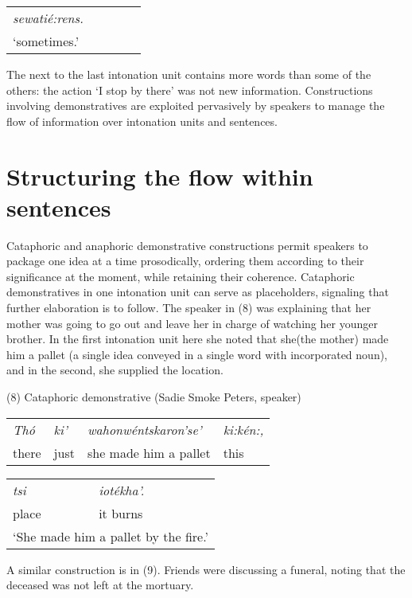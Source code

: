\documentclass[output=paper,colorlinks,citecolor=brown
]{langscibook}
\begin{document}
\begin{tabular}{lllll}
\emph{sewatié:rens.}\\
`sometimes.'
\end{tabular}\bigskip

The next to the last intonation unit contains more words than some of the others: the action `I stop by there' was not new information. 
Constructions involving demonstratives are exploited pervasively by speakers to manage the flow of information over intonation units and sentences.

\section{Structuring the flow within sentences}

Cataphoric and anaphoric demonstrative constructions permit speakers to package one idea at a time prosodically, ordering them according to their significance at the moment, while retaining their coherence. Cataphoric demonstratives in one intonation unit can serve as placeholders, signaling that further elaboration is to follow. The speaker in (8) was explaining that her mother was going to go out and leave her in charge of watching her younger brother. In the first intonation unit here she noted that she(the mother) made him a pallet (a single idea conveyed in a single word with incorporated noun), and in the second, she supplied the location.
\bigskip

(8) Cataphoric demonstrative (Sadie Smoke Peters, speaker)\\

\begin{tabular}{llll}
\emph{Thó} & \emph{ki'} & \emph{wahonwéntskaron'se'} & \emph{ki:kén:,}\\

there & just & she made him a pallet & this\\
\end{tabular}\bigskip

\begin{tabular}{ll}
\emph{tsi} & \emph{iotékha'.}\\

place & it burns\\
\multicolumn{2}{l}{`She made him a pallet by the fire.'}
\end{tabular}\bigskip

A similar construction is in (9). Friends were discussing a funeral, noting that the deceased was not left at the mortuary.\\
\end{document}
